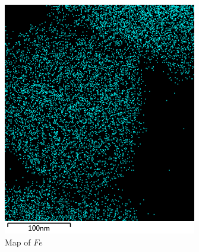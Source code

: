 \documentclass[12pt,a4paper]{article}
\begin{document}
\begin{figure}[htbp]
  \begin{subfigure}[b]{0.35\textwidth}
    \includegraphics[width=\textwidth]{Data/Fe Map.png}
    \caption{Map of $Fe$}
    \label{fig:fe_map}
  \end{subfigure}
  \begin{subfigure}[b]{0.35\textwidth}

\end{subfigure}
\end{figure}
\end{document}
